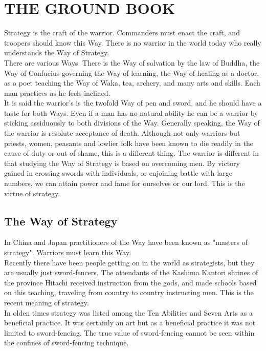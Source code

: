 \chapter{THE GROUND BOOK}

Strategy is the craft of the warrior. Commanders must enact the craft, and troopers should know this Way. There is no warrior in the world today who really understands the Way of Strategy.\\

There are various Ways. There is the Way of salvation by the law of Buddha, the Way of Confucius governing the Way of learning, the Way of healing as a doctor, as a poet teaching the Way of Waka, tea, archery, and many arts and skills. Each man practices as he feels inclined.\\

It is said the warrior's is the twofold Way of pen and sword, and he should have a taste for both Ways. Even if a man has no natural ability he can be a warrior by sticking assiduously to both divisions of the Way. Generally speaking, the Way of the warrior is resolute acceptance of death. Although not only warriors but priests, women, peasants and lowlier folk have been known to die readily in the cause of duty or out of shame, this is a different thing. The warrior is different in that studying the Way of Strategy is based on overcoming men. By victory gained in crossing swords with individuals, or enjoining battle with large numbers, we can attain power and fame for ourselves or our lord. This is the virtue of strategy.\\
\section{The Way of Strategy}

In China and Japan practitioners of the Way have been known as "masters of strategy". Warriors must learn this Way.\\

Recently there have been people getting on in the world as strategists, but they are usually just sword-fencers. The attendants of the Kashima Kantori shrines of the province Hitachi received instruction from the gods, and made schools based on this teaching, traveling from country to country instructing men. This is the recent meaning of strategy.\\

In olden times strategy was listed among the Ten Abilities and Seven Arts as a beneficial practice. It was certainly an art but as a beneficial practice it was not limited to sword-fencing. The true value of sword-fencing cannot be seen within the confines of sword-fencing technique.\\

